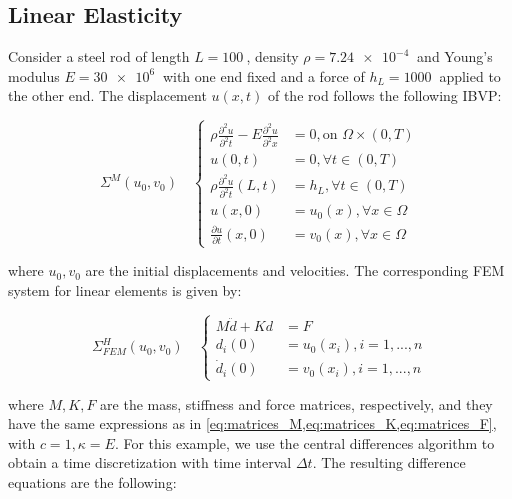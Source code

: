 \documentclass[oribibl]{llncs/llncs}
\begin{document}
\subsection{Linear Elasticity}
\label{sub:linear_elasticity}

Consider a steel rod of length $L = \SI{100}{}$, density $\rho = \SI{7.24e-4}{}$ and Young's
modulus $E = \SI{30e6}{}$ with one end fixed and a force of $h_L = \SI{1000}{}$ applied to the
other end. The displacement $u(x, t)$ of the rod follows the following IBVP:

\begin{equation}\label{eq:pde_mech}
    \Sigma^{M}(u_0, v_0) \quad \left \{
    \begin{aligned}
        \rho \frac{\partial^2 u}{\partial^2 t} - E \frac{\partial^2
        u}{\partial^2 x} &= 0, \text{on } \Omega \times (0, T) \\
        u(0, t) &= 0, \forall t \in (0, T) \\
        \rho \frac{\partial^2 u}{\partial^2 t}(L, t) &= h_L, \forall t \in (0, T) \\
        u(x, 0) &= u_0(x), \forall x \in \Omega \\
        \frac{\partial u}{\partial t}(x, 0) &= v_0(x), \forall x \in \Omega
    \end{aligned}
    \right.
\end{equation}

where $u_0, v_0$ are the initial displacements and velocities.
The corresponding FEM system for linear elements is given by:

\begin{equation}\label{eq:fem_mech}
    \Sigma^H_{FEM}(u_0, v_0) \quad \left \{
    \begin{aligned}
        M\ddot{d} + K d &= F \\
        d_i(0) &= u_0(x_i), i = 1,...,n \\
        \dot{d}_i(0) &= v_0(x_i), i = 1,...,n
    \end{aligned}
    \right.
\end{equation}

where $M, K, F$ are the mass, stiffness and force matrices, respectively, and
they have the same expressions as in
\cref{eq:matrices_M,eq:matrices_K,eq:matrices_F}, with $c = 1, \kappa = E$.
For this example, we use the central differences algorithm to obtain a time
discretization with time interval $\Delta t$. The resulting difference equations
are the following:
\end{document}
